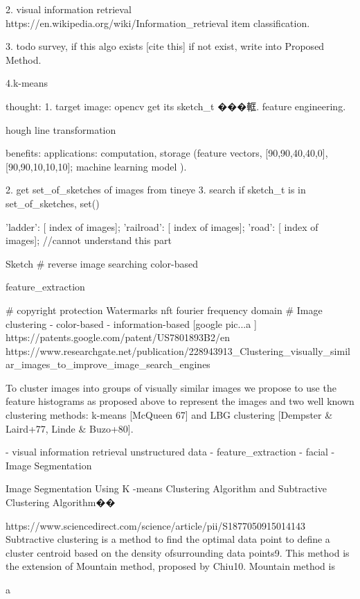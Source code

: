 2. visual information retrieval
https://en.wikipedia.org/wiki/Information_retrieval
item classification.


3. todo survey, if this algo exists [cite this]
if not exist, write into Proposed Method.

4.k-means





thought:
1. target image: opencv get its sketch_t ���軭.  feature engineering.

hough line transformation

benefits:
applications:
computation, storage (feature vectors, [90,90,40,40,0], [90,90,10,10,10];
        machine learning model ).

2. get set_of_sketches of images from tineye
3. search if sketch_t is in set_of_sketches, set()

{
'ladder': [ index of images];
'railroad': [ index of images];
'road': [ index of images];
}
//cannot understand this part
















Sketch
# reverse image searching
    color-based

    feature_extraction   

# copyright protection
    Watermarks  nft fourier frequency domain
# Image clustering
    - color-based
    - information-based [google pic...a ]
    https://patents.google.com/patent/US7801893B2/en  
    https://www.researchgate.net/publication/228943913_Clustering_visually_similar_images_to_improve_image_search_engines  {

To cluster images into groups of visually similar images we propose to use the feature histograms as proposed above to represent the images and two well known clustering methods: k-means [McQueen 67] and LBG clustering [Dempster & Laird+77, Linde & Buzo+80]. 
    }
        - visual information retrieval
         unstructured data
        - feature_extraction   
        - facial 
        - Image Segmentation  

Image Segmentation Using K -means Clustering Algorithm and Subtractive Clustering Algorithm��{
https://www.sciencedirect.com/science/article/pii/S1877050915014143
Subtractive clustering is a method to find the optimal data point to define a cluster centroid based on the density ofsurrounding data points9. This method is the extension of Mountain method, proposed by Chiu10. Mountain method is

}




a